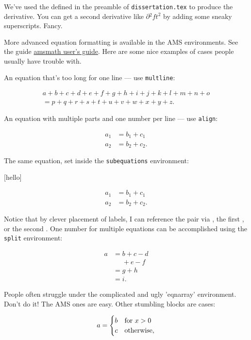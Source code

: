 We've used the defined in the preamble of \texttt{dissertation.tex} to
produce the derivative. You can get a second derivative like
$\partial{^2 f}{t^2}$ by adding some sneaky superscripts. Fancy.

More advanced equation formatting is available in the AMS environments.
See the guide
\href{ftp://ftp.ams.org/pub/tex/doc/amsmath/amsldoc.pdf}{amsmath user's
guide}. Here are some nice examples of cases people usually have trouble
with.

An equation that's too long for one line --- use \texttt{multline}:

\[\begin{gathered}
    a +b+c+d+e+f+g+h+i+j+k+l+m+n+o\\ 
    = p+q+r+s+t+u+v+w+x+y+z.\end{gathered}\]

An equation with multiple parts and one number per line --- use
\texttt{align}:

\[\begin{aligned}
    a_1 &= b_1 + c_1\\
    a_2 &= b_2 + c_2.\end{aligned}\]

The same equation, set inside the \texttt{subequations} environment:

{[}hello{]}

\[\begin{aligned}
        \label{goodbye}
        a_1 &= b_1 + c_1\\
        \label{goodbye_b}
        a_2 &= b_2 + c_2.
    \end{aligned}\]

Notice that by clever placement of labels, I can reference the pair via
, the first , or the second . One number for multiple equations can be
accomplished using the \texttt{split} environment:

\[\begin{split}
        a &= b + c - d\\
         &\phantom{=} + e - f\\
         &= g + h\\
         &= i.
    \end{split}\]

People often struggle under the complicated and ugly 'eqnarray'
environment. Don't do it! The AMS ones are easy. Other stumbling blocks
are cases:

\[a = \begin{cases}
        b & \text{for $ x > 0$}\\
        c & \text{otherwise,}
    \end{cases}\]

